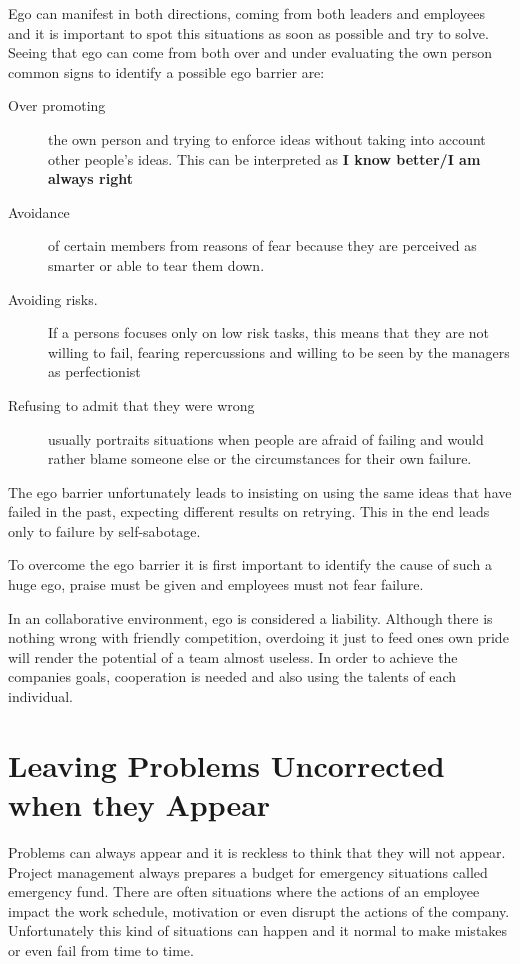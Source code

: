 Ego can manifest in both directions, coming from both leaders and employees and it is important to spot this situations as soon as possible and try to solve. Seeing that ego can come from both over and under evaluating the own person common signs to identify a possible ego barrier are:
\begin{description}
\item [Over promoting] the own person and trying to enforce ideas without taking into account other people's ideas. This can be interpreted as \textbf{I know better/I am always right}
\item [Avoidance] of certain members from reasons of fear because they are perceived as smarter or able to tear them down.
\item [Avoiding risks.] If a persons focuses only on low risk tasks, this means that they are not willing to fail, fearing repercussions and willing to be seen by the managers as perfectionist
\item [Refusing to admit that they were wrong] usually portraits situations when people are afraid of failing and would rather blame someone else or the circumstances for their own failure.
\end{description}

The ego barrier unfortunately leads to insisting on using the same ideas that have failed in the past, expecting different results on retrying. This in the end leads only to failure by self-sabotage.

To overcome the ego barrier it is first important to identify the cause of such a huge ego, praise must be given and employees must not fear failure.

In an collaborative environment, ego is considered a liability. Although there is nothing wrong with friendly competition, overdoing it just to feed ones own pride will render the potential of a team almost useless. In order  to achieve the companies goals, cooperation is needed and also using the talents of each individual. 

\section{Leaving Problems Uncorrected when they Appear}
\label{sec:uncorrected}
Problems can always appear and it is reckless to think that they will not appear. Project management always prepares a budget for emergency situations called  emergency fund.
There are often situations where the actions of an employee impact the work schedule, motivation or even disrupt the actions of the company. Unfortunately this kind of situations can happen and it normal to make mistakes or even fail from time to time. 

